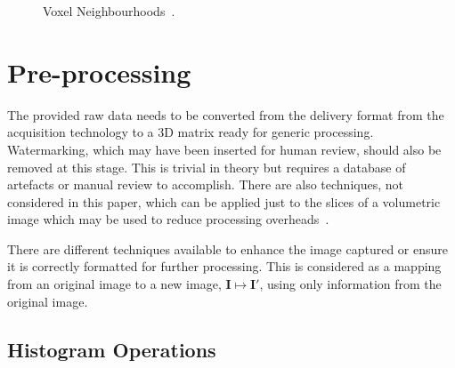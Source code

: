 \documentclass[journal]{IEEEtran}
\begin{document}
\begin{figure}
	\centering
\caption{Voxel Neighbourhoods~\cite{lohmann1998volumetric}.}
\label{fig:neighbourhood}
\end{figure}










\section{Pre-processing}
\label{sec:pre}

The provided raw data needs to be converted from the delivery format from the acquisition technology to a 3D matrix ready for generic processing.
Watermarking, which may have been inserted for human review, should also be removed at this stage. 
This is trivial in theory but requires a database of artefacts or manual review to accomplish.
There are also techniques, not considered in this paper, which can be applied just to the slices of a volumetric image which may be used to reduce processing overheads~\cite{harauz86exact}.

There are different techniques available to enhance the image captured or ensure it is correctly formatted for further processing.
This is considered as a mapping from an original image to a new image, $\textbf{I} \mapsto \textbf{I}'$, using only information from the original image.

\subsection{Histogram Operations}
\end{document}
